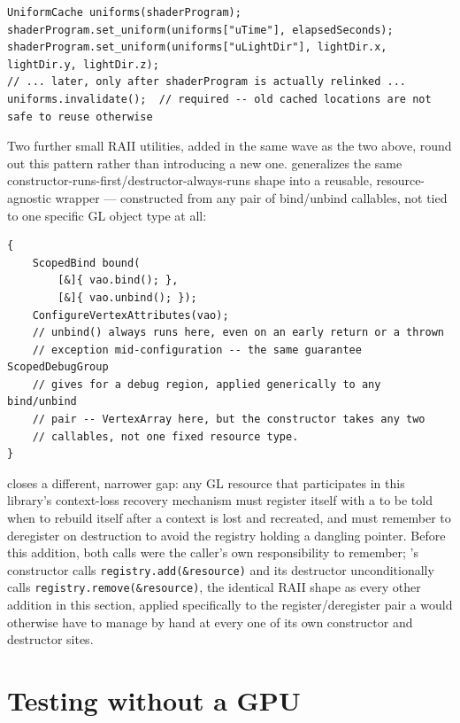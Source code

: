 \begin{lstlisting}
UniformCache uniforms(shaderProgram);
shaderProgram.set_uniform(uniforms["uTime"], elapsedSeconds);
shaderProgram.set_uniform(uniforms["uLightDir"], lightDir.x, lightDir.y, lightDir.z);
// ... later, only after shaderProgram is actually relinked ...
uniforms.invalidate();  // required -- old cached locations are not safe to reuse otherwise
\end{lstlisting}

Two further small RAII utilities, added in the same wave as the two above, round out this
pattern rather than introducing a new one.  generalizes the same
constructor-runs-first/destructor-always-runs shape into a reusable, resource-agnostic
wrapper --- constructed from any pair of bind/unbind callables, not tied to one specific GL
object type at all:

\begin{lstlisting}
{
    ScopedBind bound(
        [&]{ vao.bind(); },
        [&]{ vao.unbind(); });
    ConfigureVertexAttributes(vao);
    // unbind() always runs here, even on an early return or a thrown
    // exception mid-configuration -- the same guarantee ScopedDebugGroup
    // gives for a debug region, applied generically to any bind/unbind
    // pair -- VertexArray here, but the constructor takes any two
    // callables, not one fixed resource type.
}
\end{lstlisting}

 closes a different, narrower gap: any GL resource that
participates in this library's context-loss recovery mechanism must register itself with a
 to be told when to rebuild itself after a context is lost and
recreated, and must remember to deregister on destruction to avoid the registry holding a
dangling pointer. Before this addition, both calls were the caller's own responsibility to
remember; 's constructor calls \texttt{registry.add(\&resource)}
and its destructor unconditionally calls \texttt{registry.remove(\&resource)}, the identical
RAII shape as every other addition in this section, applied specifically to the
register/deregister pair a  would otherwise have to manage by
hand at every one of its own constructor and destructor sites.

\section{Testing without a GPU}

